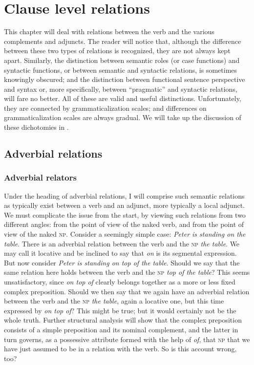 \section{Clause level relations}\label{sec:3.4}

This chapter will deal with relations between the verb and the various complements and adjuncts. The reader will notice that, although the difference between these two types of relations is recognized, they are not always kept apart. Similarly, the distinction between semantic roles (or case functions) and syntactic functions, or between semantic and syntactic relations, is sometimes knowingly obscured; and the distinction between functional sentence perspective and syntax or, more specifically, between “pragmatic” and syntactic relations, will fare no better. All of these are valid and useful distinctions. Unfortunately, they are connected by grammaticalization scales; and differences on grammaticalization scales are always gradual. We will take up the discussion of these dichotomies in .

\subsection{Adverbial relations} \label{sec:3.4.1}
\subsubsection{Adverbial relators} \label{sec:3.4.1.1}


Under the heading of adverbial relations, I will comprise such semantic relations as typically exist between a verb and an adjunct, more typically a local adjunct. We must complicate the issue from the start, by viewing such relations from two different angles: from the point of view of the naked verb, and from the point of view of the naked \textsc{np}. Consider a seemingly simple case: \textit{Peter is standing on the table}. There is an adverbial relation between the verb and the \textsc{np} \textit{the table}. We may call it locative and be inclined to say that \textit{on} is its segmental expression. But now consider \textit{Peter is standing on top of the table}. Should we say that the same relation here holds between the verb and the \textsc{np} \textit{top of the table}? This seems unsatisfactory, since \textit{on top of} clearly belongs together as a more or less fixed complex preposition. Should we then say that we again have an adverbial relation between the verb and the \textsc{np} \textit{the table}, again a locative one, but this time expressed by \textit{on top of}? This might be true; but it would certainly not be the whole truth. Further structural analysis will show that the complex preposition consists of a simple preposition and its nominal complement, and the latter in turn governs, as a possessive attribute formed with the help of \textit{of}, that \textsc{np} that we have just assumed to be in a relation with the verb. So is this account wrong, too?

